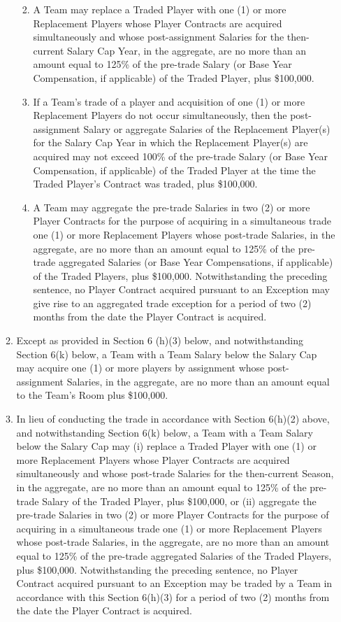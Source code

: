 \documentclass[
]{book}
\providecommand{\tightlist}{%
  \setlength{\itemsep}{0pt}\setlength{\parskip}{0pt}}
\begin{document}
\begin{enumerate}
\begin{enumerate}
    \begin{enumerate}
    \def\labelenumiii{(\roman{enumiii})}
    \tightlist
    \item
      A Team may replace a Traded Player with one (1) or more Replacement Players whose Player Contracts are acquired simultaneously and whose post-assignment Salaries for the then-current Salary Cap Year, in the aggregate, are no more than an amount equal to 125\% of the pre-trade Salary (or Base Year Compensation, if applicable) of the Traded Player, plus \$100,000.
    \item
      If a Team's trade of a player and acquisition of one (1) or more Replacement Players do not occur simultaneously, then the post-assignment Salary or aggregate Salaries of the Replacement Player(s) for the Salary Cap Year in which the Replacement Player(s) are acquired may not exceed 100\% of the pre-trade Salary (or Base Year Compensation, if applicable) of the Traded Player at the time the Traded Player's Contract was traded, plus \$100,000.
    \item
      A Team may aggregate the pre-trade Salaries in two (2) or more Player Contracts for the purpose of acquiring in a simultaneous trade one (1) or more Replacement Players whose post-trade Salaries, in the aggregate, are no more than an amount equal to 125\% of the pre-trade aggregated Salaries (or Base Year Compensations, if applicable) of the Traded Players, plus \$100,000. Notwithstanding the preceding sentence, no Player Contract acquired pursuant to an Exception may give rise to an aggregated trade exception for a period of two (2) months from the date the Player Contract is acquired.
    \end{enumerate}
  \item
    Except as provided in Section 6 (h)(3) below, and notwithstanding Section 6(k) below, a Team with a Team Salary below the Salary Cap may acquire one (1) or more players by assignment whose post-assignment Salaries, in the aggregate, are no more than an amount equal to the Team's Room plus \$100,000.
  \item
    In lieu of conducting the trade in accordance with Section 6(h)(2) above, and notwithstanding Section 6(k) below, a Team with a Team Salary below the Salary Cap may (i) replace a Traded Player with one (1) or more Replacement Players whose Player Contracts are acquired simultaneously and whose post-trade Salaries for the then-current Season, in the aggregate, are no more than an amount equal to 125\% of the pre-trade Salary of the Traded Player, plus \$100,000, or (ii) aggregate the pre-trade Salaries in two (2) or more Player Contracts for the purpose of acquiring in a simultaneous trade one (1) or more Replacement Players whose post-trade Salaries, in the aggregate, are no more than an amount equal to 125\% of the pre-trade aggregated Salaries of the Traded Players, plus \$100,000. Notwithstanding the preceding sentence, no Player Contract acquired pursuant to an Exception may be traded by a Team in accordance with this Section 6(h)(3) for a period of two (2) months from the date the Player Contract is acquired.

\end{enumerate}
\end{enumerate}
\end{document}
